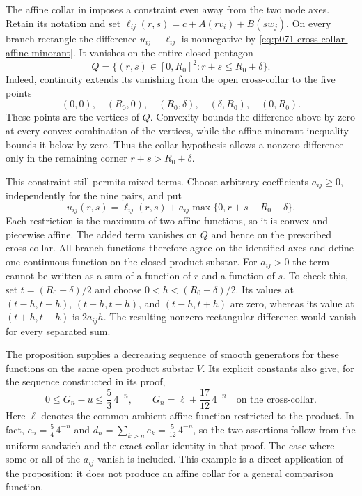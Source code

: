 \begin{example}
\label{ex:p071-cross-collar-corner-coupling}
The affine collar in
 imposes a
constraint even away from the two node axes.  Retain its notation and set
$\ell_{ij}(r,s)=c+A(rv_i)+B(sw_j)$.  On every branch rectangle the
difference $u_{ij}-\ell_{ij}$ is nonnegative by
\eqref{eq:p071-cross-collar-affine-minorant}.  It vanishes on the entire
closed pentagon
\[
 Q=\{(r,s)\in[0,R_0]^2:r+s\leq R_0+\delta\}.
\]
Indeed, continuity extends its vanishing from the open cross-collar to
the five points
\[
 (0,0),\quad (R_0,0),\quad (R_0,\delta),\quad
 (\delta,R_0),\quad (0,R_0).
\]
These points are the vertices of $Q$.  Convexity bounds the difference
above by zero at every convex combination of the vertices, while the
affine-minorant inequality bounds it below by zero.  Thus the collar
hypothesis allows a nonzero difference only in the remaining corner
$r+s>R_0+\delta$.

This constraint still permits mixed terms.  Choose arbitrary coefficients
$a_{ij}\geq0$, independently for the nine pairs, and put
\[
 u_{ij}(r,s)=\ell_{ij}(r,s)
       +a_{ij}\max\{0,r+s-R_0-\delta\}.
\]
Each restriction is the maximum of two affine functions, so it is convex
and piecewise affine.  The added term vanishes on $Q$ and hence on the
prescribed cross-collar.  All branch functions therefore agree on the
identified axes and define one continuous function on the closed product
substar.  For $a_{ij}>0$ the term cannot be written as a sum of a function
of $r$ and a function of $s$.  To check this, set
$t=(R_0+\delta)/2$ and choose $0<h<(R_0-\delta)/2$.  Its values at
$(t-h,t-h)$, $(t+h,t-h)$, and $(t-h,t+h)$ are zero, whereas its value at
$(t+h,t+h)$ is $2a_{ij}h$.  The resulting nonzero rectangular difference
would vanish for every separated sum.

The proposition supplies a decreasing sequence of smooth generators for
these functions on the same open product substar $V$.  Its explicit
constants also give, for the sequence constructed in its proof,
\[
 0\leq G_n-u\leq\frac53\,4^{-n},
 \qquad
 G_n=\ell+\frac{17}{12}\,4^{-n}
 \quad\text{on the cross-collar}.
\]
Here $\ell$ denotes the common ambient affine function restricted to the
product.  In fact, $e_n=\frac54\,4^{-n}$ and
$d_n=\sum_{k>n}e_k=\frac5{12}\,4^{-n}$, so the two assertions follow from
the uniform sandwich and the exact collar identity in that proof.  The
case where some or all of the $a_{ij}$ vanish is included.  This example
is a direct application of the proposition; it does not produce an
affine collar for a general comparison function.
\end{example}


